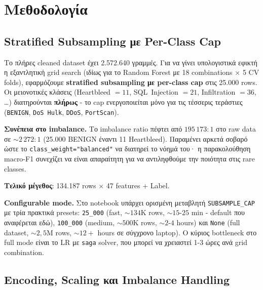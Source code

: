 \documentclass[12pt,a4paper,twoside]{book}
\begin{document}
\section{Μεθοδολογία}\label{sec:q2_methodology}

\subsection{Stratified Subsampling με Per-Class Cap}

Το πλήρες cleaned dataset έχει 2.572.640 γραμμές. Για να γίνει
υπολογιστικά εφικτή η εξαντλητική grid search (ιδίως για το Random
Forest με 18 combinations \(\times\) 5 CV folds), εφαρμόζουμε
\textbf{stratified subsampling με per-class cap} στις
\textsc{25.000} rows. Οι μειονοτικές κλάσεις (Heartbleed \(=11\),
SQL~Injection \(=21\), Infiltration \(=36\), \dots) διατηρούνται
\textbf{πλήρως} - το cap ενεργοποιείται μόνο για τις τέσσερις τεράστιες
(\texttt{BENIGN}, \texttt{DoS~Hulk}, \texttt{DDoS}, \texttt{PortScan}).

\textbf{Συνέπεια στο imbalance.} Το imbalance ratio πέφτει από
\(195\,173{:}1\) στο raw data σε \(\sim 2\,272{:}1\)
(25.000 BENIGN έναντι 11 Heartbleed). Παραμένει αρκετά σοβαρό ώστε το
\texttt{class\_weight="balanced"} να διατηρεί το νόημά του· η
παρακολούθηση macro-F1 συνεχίζει να είναι απαραίτητη για να
αντιληφθούμε την ποιότητα στις rare classes.

\textbf{Τελικό μέγεθος}: 134.187 rows \(\times\) 47 features + Label.

\textbf{Configurable mode.} Στο notebook υπάρχει ορισμένη μεταβλητή
\texttt{SUBSAMPLE\_CAP} με τρία πρακτικά presets: \texttt{25\_000}
(fast, \(\sim 134\)K rows, \(\sim 15\text{-}25\) min - default που
αναφέρεται εδώ), \texttt{100\_000} (medium, \(\sim 500\)K rows,
\(\sim 2\text{-}4\) hours) και \texttt{None} (full dataset,
\(\sim 2{,}5\)M rows, \(\sim 12+\) hours σε σύγχρονο laptop). Ο
κύριος bottleneck στο full mode είναι το LR με \texttt{saga} solver,
που μπορεί να χρειαστεί 1-3 ώρες ανά grid combination.

\subsection{Encoding, Scaling και Imbalance Handling}
\end{document}
